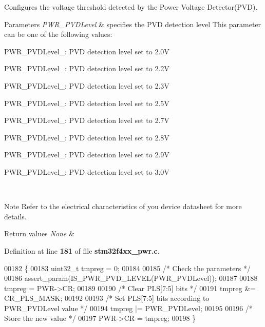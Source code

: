 Configures the voltage threshold detected by the Power Voltage Detector(\+P\+V\+D). 


\begin{DoxyParams}{Parameters}
{\em P\+W\+R\+\_\+\+P\+V\+D\+Level} & specifies the P\+VD detection level This parameter can be one of the following values\+: \begin{DoxyItemize}
\item P\+W\+R\+\_\+\+P\+V\+D\+Level\+\_\+: P\+VD detection level set to 2.\+0V \item P\+W\+R\+\_\+\+P\+V\+D\+Level\+\_\+: P\+VD detection level set to 2.\+2V \item P\+W\+R\+\_\+\+P\+V\+D\+Level\+\_\+: P\+VD detection level set to 2.\+3V \item P\+W\+R\+\_\+\+P\+V\+D\+Level\+\_\+: P\+VD detection level set to 2.\+5V \item P\+W\+R\+\_\+\+P\+V\+D\+Level\+\_\+: P\+VD detection level set to 2.\+7V \item P\+W\+R\+\_\+\+P\+V\+D\+Level\+\_\+: P\+VD detection level set to 2.\+8V \item P\+W\+R\+\_\+\+P\+V\+D\+Level\+\_\+: P\+VD detection level set to 2.\+9V \item P\+W\+R\+\_\+\+P\+V\+D\+Level\+\_\+: P\+VD detection level set to 3.\+0V \end{DoxyItemize}
\\
\hline
\end{DoxyParams}
\begin{DoxyNote}{Note}
Refer to the electrical characteristics of you device datasheet for more details. 
\end{DoxyNote}

\begin{DoxyRetVals}{Return values}
{\em None} & \\
\hline
\end{DoxyRetVals}


Definition at line \textbf{ 181} of file \textbf{ stm32f4xx\+\_\+pwr.\+c}.


\begin{DoxyCode}
00182 \{
00183   uint32\_t tmpreg = 0;
00184   
00185   \textcolor{comment}{/* Check the parameters */}
00186   assert_param(IS_PWR_PVD_LEVEL(PWR\_PVDLevel));
00187   
00188   tmpreg = PWR->CR;
00189   
00190   \textcolor{comment}{/* Clear PLS[7:5] bits */}
00191   tmpreg &= CR_PLS_MASK;
00192   
00193   \textcolor{comment}{/* Set PLS[7:5] bits according to PWR\_PVDLevel value */}
00194   tmpreg |= PWR\_PVDLevel;
00195   
00196   \textcolor{comment}{/* Store the new value */}
00197   PWR->CR = tmpreg;
00198 \}
\end{DoxyCode}
